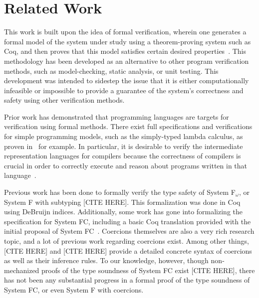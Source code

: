 \documentclass{sig-alternate}
\begin{document}
\section{Related Work}
\label{sec:related-work}
This work is built upon the idea of formal verification, wherein one generates a formal
model of the system under study using a theorem-proving system such as Coq, and then proves 
that this model satisfies certain desired properties~\cite{series/natosec/CousotC10}. This 
methodology has been developed as an alternative to other program verification methods, such as 
model-checking, static analysis, or unit testing. This development was intended to sidestep the 
issue that it is either computationally infeasible or impossible to provide a guarantee of the 
system's correctness and safety using other verification methods.

Prior work has demonstrated that programming languages are targets for verification using 
formal methods. There exist full specifications and verifications for simple programming
models, such as the simply-typed lambda calculus, as proven in~\cite{Pierce:SF} for example. In particular, it is desirable to verify the intermediate representation languages for compilers because the correctness of compilers is crucial in order to correctly execute and reason about programs written in that language~\cite{Zhao:2012:FLI:2103656.2103709}.

Previous work has been done to formally verify the type safety of System F$_\omega$, or System F with subtyping [CITE HERE]. This formalization was done in Coq using DeBruijn indices. Additionally, some work has gone into formalizing the specification for System FC, including a basic 
Coq translation provided with the initial proposal of System FC~\cite{conf/tldi/SulzmannCJD07}. Coercions themselves are also a very rich research topic, and a lot of previous work regarding coercions exist. Among other things, [CITE HERE] and [CITE HERE] provide a detailed concrete syntax of coercions as well as their inference rules.
To our knowledge, however, though non-mechanized proofs of the type soundness of System FC exist [CITE HERE], there has not been any substantial progress in a formal proof of the type soundness of System FC, or even System F with coercions.
\end{document}
